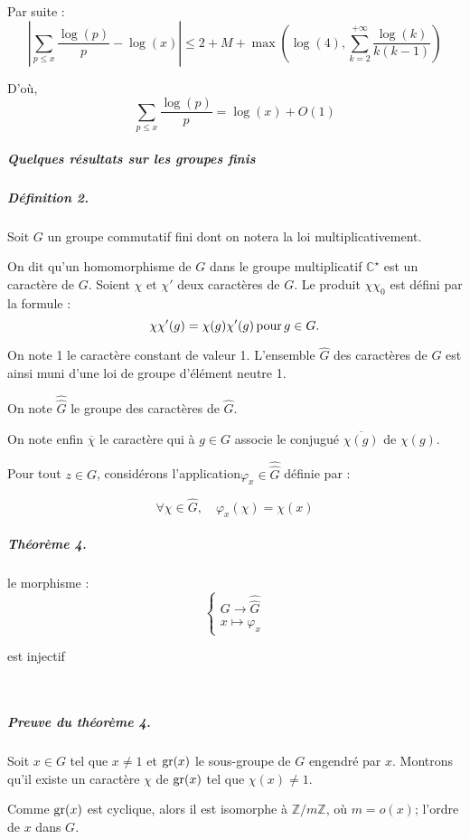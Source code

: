 Par suite :
\[ \left| \sum_{p \leqslant x} \frac{\log (p)}{p} - \log (x) \right| \leqslant
   2 + M + \max \left( \log (4), \sum^{+ \infty}_{k = 2} \frac{\log (k)}{k (k
   - 1)} \right) \]


D'o{\`u},
\[ \underset{p \leqslant x}{\sum} \frac{\log (p)}{p} = \log (x) + O (1) \]


\subparagraph{Quelques r{\'e}sultats sur les groupes finis}

\subparagraph{D{\'e}finition 2.}

Soit $G$ un groupe commutatif fini dont on notera la loi multiplicativement.

On dit qu'un homomorphisme de $G$ dans le groupe multiplicatif
$\mathbb{C}^{\star}$ est un caract{\`e}re de $G$. Soient $\chi$ et $\chi'$
deux caract{\`e}res de $G$. Le produit $\chi \chi_0$ est d{\'e}fini par la
formule :
\[ \chi \chi' (g) = \chi (g) \chi' (g) \operatorname{pour} g \in G. \]


On note 1 le caract{\`e}re constant de valeur 1. L'ensemble $\hat{G}$ des
caract{\`e}res de $G$ est ainsi muni d'une loi de groupe d'{\'e}l{\'e}ment
neutre 1.

On note $\widehat{\hat{G}}$ le groupe des caract{\`e}res de $\hat{G}$.

On note enfin $\overline{\chi}$ le caract{\`e}re qui {\`a} $g \in G$ associe
le conjugu{\'e} $\overline{\chi (g)}$ de $\chi (g)$.

Pour tout $z \in G$, consid{\'e}rons l'application$\varphi_x \in
\widehat{\hat{G}}$ d{\'e}finie par :


\[ \forall \chi \in \hat{G}, \quad \varphi_x (\chi) = \chi (x) \]

\subparagraph{Th{\'e}or{\`e}me 4.}

le morphisme :
\[ \left\{\begin{array}{l}
     G \rightarrow \widehat{\hat{G}}\\
     x \longmapsto \varphi_x
   \end{array}\right. \]


est injectif

\

\subparagraph{Preuve du th{\'e}or{\`e}me 4.}

Soit $x \in G$ tel que $x \neq 1$ et $\operatorname{gr} (x)$ le sous-groupe de $G$
engendr{\'e} par $x$. Montrons qu'il existe un caract{\`e}re $\chi$ de
$\operatorname{gr} (x)$ tel que $\chi (x) \neq 1$.

Comme $\operatorname{gr} (x)$ est cyclique, alors il est isomorphe {\`a} $\mathbb{Z}/
m\mathbb{Z}$, o{\`u} $m = o (x)$; l'ordre de $x$ dans $G$.

